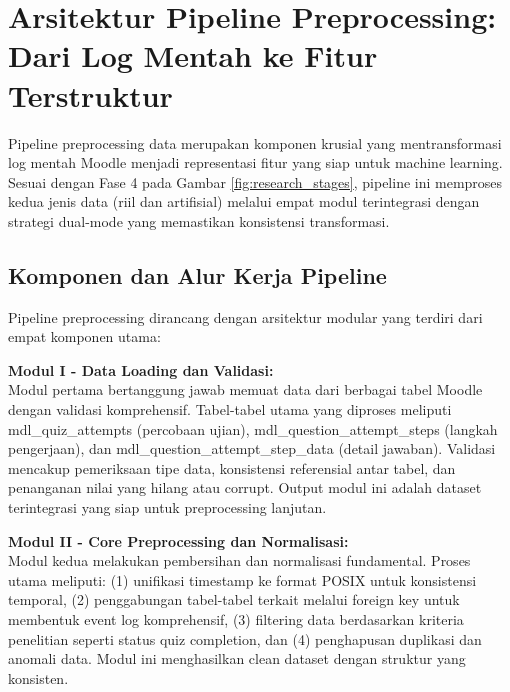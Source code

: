 \section{Arsitektur Pipeline Preprocessing: Dari Log Mentah ke Fitur Terstruktur}
\label{sec:pipelinePreprocessing}
Pipeline preprocessing data merupakan komponen krusial yang mentransformasi log mentah Moodle menjadi representasi fitur yang siap untuk machine learning. Sesuai dengan Fase 4 pada Gambar \ref{fig:research_stages}, pipeline ini memproses kedua jenis data (riil dan artifisial) melalui empat modul terintegrasi dengan strategi dual-mode yang memastikan konsistensi transformasi.

\subsection{Komponen dan Alur Kerja Pipeline}
\label{sec:komponenPipeline}

Pipeline preprocessing dirancang dengan arsitektur modular yang terdiri dari empat komponen utama:

\textbf{Modul I - Data Loading dan Validasi:} \\
Modul pertama bertanggung jawab memuat data dari berbagai tabel Moodle dengan validasi komprehensif. Tabel-tabel utama yang diproses meliputi mdl\_quiz\_attempts (percobaan ujian), mdl\_question\_attempt\_steps (langkah pengerjaan), dan mdl\_question\_attempt\_step\_data (detail jawaban). Validasi mencakup pemeriksaan tipe data, konsistensi referensial antar tabel, dan penanganan nilai yang hilang atau corrupt. Output modul ini adalah dataset terintegrasi yang siap untuk preprocessing lanjutan.

\textbf{Modul II - Core Preprocessing dan Normalisasi:} \\
Modul kedua melakukan pembersihan dan normalisasi fundamental. Proses utama meliputi: (1) unifikasi timestamp ke format POSIX untuk konsistensi temporal, (2) penggabungan tabel-tabel terkait melalui foreign key untuk membentuk event log komprehensif, (3) filtering data berdasarkan kriteria penelitian seperti status quiz completion, dan (4) penghapusan duplikasi dan anomali data. Modul ini menghasilkan clean dataset dengan struktur yang konsisten.

